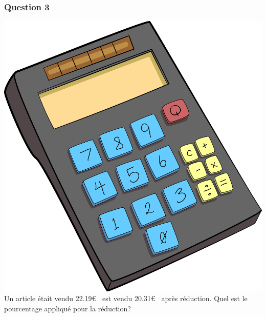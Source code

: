 \documentclass[15pt, mathserif]{beamer}
\begin{document}
\begin{frame} 
	\frametitle{Question 3}
\includegraphics[scale=0.01]{calculatrice}Un article était vendu 22.19\euro ~ est vendu 20.31\euro ~ après réduction. Quel est le pourcentage appliqué pour la réduction? \end{frame}
\end{document}
